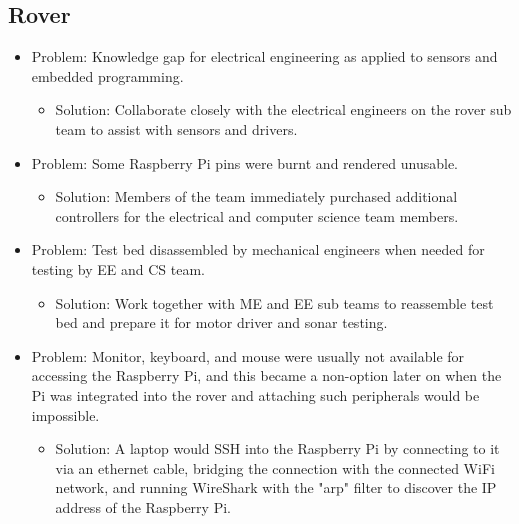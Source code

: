 \documentclass[onecolumn, draftclsnofoot, 10pt, compsoc]{IEEEtran}
\begin{document}
\subsection{Rover}
\begin{itemize}
\item Problem: Knowledge gap for electrical engineering as applied to sensors and embedded programming.
\begin{itemize}
\item Solution: Collaborate closely with the electrical engineers on the rover sub team to assist with sensors and drivers.
\end{itemize}
\item Problem: Some Raspberry Pi pins were burnt and rendered unusable.
\begin{itemize}
\item Solution: Members of the team immediately purchased additional controllers for the electrical and computer science team members.
\end{itemize}
\item Problem: Test bed disassembled by mechanical engineers when needed for testing by EE and CS team.
\begin{itemize}
\item Solution: Work together with ME and EE sub teams to reassemble test bed and prepare it for motor driver and sonar testing.
\end{itemize}
\item Problem: Monitor, keyboard, and mouse were usually not available for accessing the Raspberry Pi, and this became a non-option later on when the Pi was integrated into the rover and attaching such peripherals would be impossible.
\begin{itemize}
\item Solution: A laptop would SSH into the Raspberry Pi by connecting to it via an ethernet cable, bridging the connection with the connected WiFi network, and running WireShark with the "arp" filter to discover the IP address of the Raspberry Pi.
\end{itemize}
\end{itemize}
\end{document}
